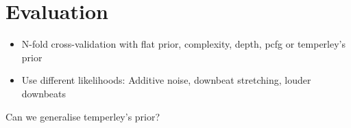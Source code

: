 \section{Evaluation}
\label{sec:evaluation}

\begin{itemize}
\item N-fold cross-validation with flat prior, complexity, depth, pcfg or temperley's prior
\item Use different likelihoods: Additive noise, downbeat stretching, louder downbeats
\end{itemize}

Can we generalise temperley's prior?

